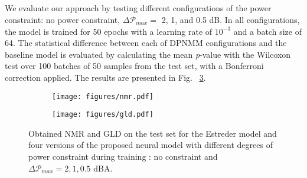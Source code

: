 \subsection{}
We evaluate our approach by testing different configurations of the power constraint: no power constraint, $\Delta \mathcal{P}_{max} =$ 2, 1, and 0.5 dB. In all configurations, the model is trained for 50 epochs with a learning rate of $10^{-3}$ and a batch size of 64. The statistical difference between each of DPNMM configurations and the baseline model is evaluated by calculating the mean \textit{p}-value with the Wilcoxon test over 100 batches of 50 samples from the test set, with a Bonferroni correction applied.
The results are presented in Fig. ~\ref{fig:results}. 

\begin{figure}
\centering
\begin{subfigure}{\linewidth}
    \texttt{[image: figures/nmr.pdf]}
    \label{fig:nmr}
\end{subfigure}
\begin{subfigure}{\linewidth}
    \texttt{[image: figures/gld.pdf]}
    \label{fig:gld}
\end{subfigure}
        
\caption{Obtained NMR and GLD on the test set for the Estreder model and four versions of the proposed neural model with different degrees of power constraint during training : no constraint and $\Delta \mathcal{P}_{max} = 2, 1, 0.5$ dBA.}\vspace{-0.3cm}
\label{fig:results}
\end{figure}



